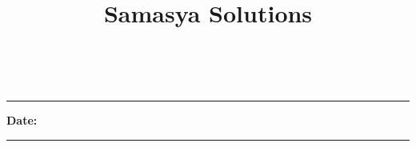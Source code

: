\documentclass[10pt,a4paper,notitlepage]{article}
\title{\textrm{\textbf{\fontsize{30}{40}\selectfont Samasya Solutions}}}
\date{%
    }
\theoremstyle{definition}
\begin{document}
\maketitle

\\
\hrule

\textbf{Date:}%
\\
\hrule

\end{document}
